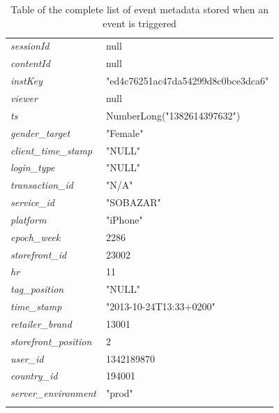 \begin{table}[H]
\begin{tabular}{l|l}
            \emph{sessionId} &   null     \\
            \emph{contentId} &   null     \\
            \emph{instKey}   &   "ed4c76251ac47da54299d8c0bce3dca6"   \\
            \emph{viewer}    &   null     \\
            \emph{ts}    &   NumberLong("1382614397632")  \\
            \emph{gender\_target} &   "Female"     \\
            \emph{client\_time\_stamp} &   "NULL"   \\
            \emph{login\_type}    &   "NULL"   \\
            \emph{transaction\_id}    &   "N/A"    \\
            \emph{service\_id}    &   "SOBAZAR"    \\
            \emph{platform}  &   "iPhone"     \\
            \emph{epoch\_week}    &   2286     \\
            \emph{storefront\_id} &   23002    \\
            \emph{hr}    &   11   \\
            \emph{tag\_position}  &   "NULL"   \\
            \emph{time\_stamp}    &   "2013-10-24T13:33+0200"  \\
            \emph{retailer\_brand}    &   13001    \\
            \emph{storefront\_position}   &   2    \\
            \emph{user\_id}   &   1342189870   \\
            \emph{country\_id}    &   194001   \\
            \emph{server\_environment}    &   "prod" \\
            \bottomrule
        \caption[Complete List of Event Metadata]{Table of the complete list of event metadata stored when an event is triggered}
        \label{table:completeEventData}
        \end{tabular}
    \end{table}

